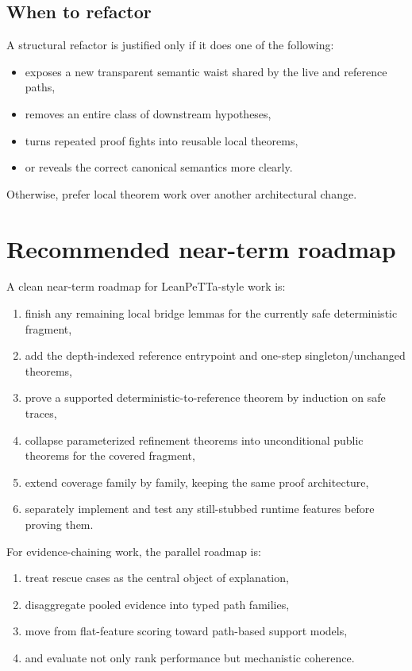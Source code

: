 \documentclass[11pt]{article}
\begin{document}
\subsection{When to refactor}

A structural refactor is justified only if it does one of the following:

\begin{itemize}
  \item exposes a new transparent semantic waist shared by the live and reference paths,
  \item removes an entire class of downstream hypotheses,
  \item turns repeated proof fights into reusable local theorems,
  \item or reveals the correct canonical semantics more clearly.
\end{itemize}

Otherwise, prefer local theorem work over another architectural change.

\section{Recommended near-term roadmap}

A clean near-term roadmap for LeanPeTTa-style work is:

\begin{enumerate}
  \item finish any remaining local bridge lemmas for the currently safe deterministic fragment,
  \item add the depth-indexed reference entrypoint and one-step singleton/unchanged theorems,
  \item prove a supported deterministic-to-reference theorem by induction on safe traces,
  \item collapse parameterized refinement theorems into unconditional public theorems for the covered fragment,
  \item extend coverage family by family, keeping the same proof architecture,
  \item separately implement and test any still-stubbed runtime features before proving them.
\end{enumerate}

For evidence-chaining work, the parallel roadmap is:

\begin{enumerate}
  \item treat rescue cases as the central object of explanation,
  \item disaggregate pooled evidence into typed path families,
  \item move from flat-feature scoring toward path-based support models,
  \item and evaluate not only rank performance but mechanistic coherence.
\end{enumerate}
\end{document}
